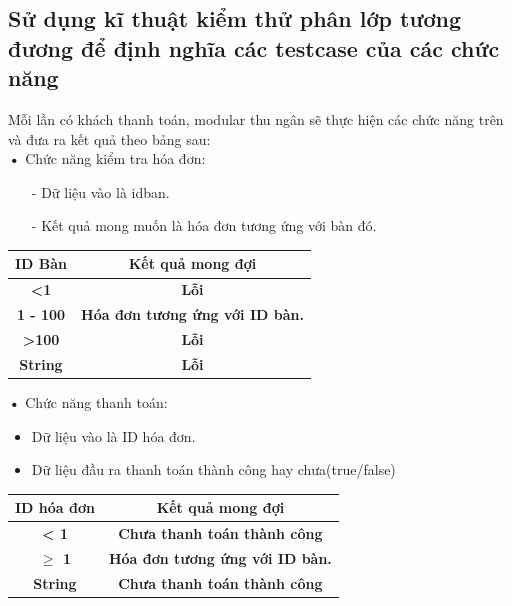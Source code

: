 \documentclass[a4paper,12pt]{report}
\begin{document}
\subsection{Sử dụng kĩ thuật kiểm thử phân lớp tương đương để định nghĩa các testcase của các chức năng}
Mỗi lần có khách thanh toán, modular thu ngân sẽ thực hiện các chức năng trên và đưa ra kết quả theo bảng sau:\\
\textbf{•} Chức năng kiểm tra hóa đơn:
\begin{itemize}
\item[-] Dữ liệu vào là idban.
\item[-] Kết quả mong muốn là hóa đơn tương ứng với bàn đó.
\end{itemize}
\begin{longtable}{|c|c|}
\hline
\textbf{ID Bàn}   			& \textbf{Kết quả mong đợi} \\
\hline
\textbf{<1} &\textbf{ Lỗi} \\
\hline
\textbf{1 - 100} & \textbf{Hóa đơn tương ứng với ID bàn.} \\
\hline
\textbf{>100} & \textbf{Lỗi}\\
\hline
\textbf{String} & \textbf{Lỗi}\\
\hline
\end{longtable}
\textbf{•} Chức năng thanh toán:
\begin{itemize}
\item Dữ liệu vào là ID hóa đơn.
\item Dữ liệu đầu ra thanh toán thành công hay chưa(true/false)
\end{itemize}
\begin{longtable}{|c|c|}
\hline
\textbf{ID hóa đơn}   			& \textbf{Kết quả mong đợi} \\
\hline
\textbf{< 1} &\textbf{ Chưa thanh toán thành công} \\
\hline
\textbf{$\geq$ 1} & \textbf{Hóa đơn tương ứng với ID bàn.} \\
\hline
\textbf{String} & \textbf{ Chưa thanh toán thành công}\\
\hline
\end{longtable}
\end{document}
